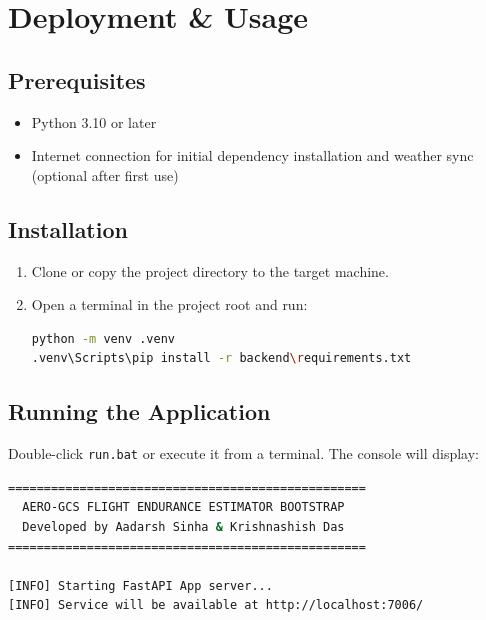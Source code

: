 \documentclass[11pt,a4paper]{article}
\begin{document}
\newpage

\section{Deployment \& Usage}

\subsection{Prerequisites}
\begin{itemize}[noitemsep]
    \item Python 3.10 or later
    \item Internet connection for initial dependency installation and weather sync (optional after first use)
\end{itemize}

\subsection{Installation}
\begin{enumerate}
    \item Clone or copy the project directory to the target machine.
    \item Open a terminal in the project root and run:
\begin{lstlisting}[language=bash, caption={Virtual environment setup}]
python -m venv .venv
.venv\Scripts\pip install -r backend\requirements.txt
\end{lstlisting}
\end{enumerate}

\subsection{Running the Application}
Double-click \texttt{run.bat} or execute it from a terminal. The console will display:

\begin{lstlisting}[language=bash, caption={Application startup output}]
==================================================
  AERO-GCS FLIGHT ENDURANCE ESTIMATOR BOOTSTRAP
  Developed by Aadarsh Sinha & Krishnashish Das
==================================================

[INFO] Starting FastAPI App server...
[INFO] Service will be available at http://localhost:7006/
\end{lstlisting}
\end{document}
